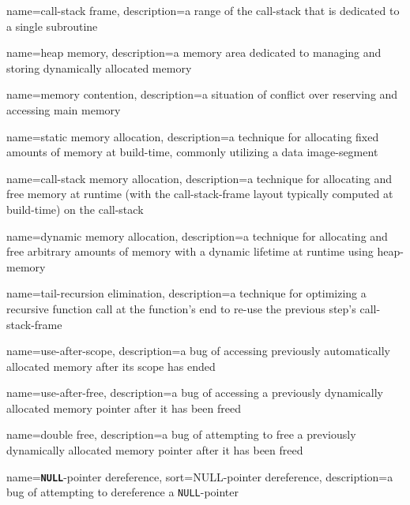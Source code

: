 {
  name={\gls{call-stack} frame},
  description={a range of the \gls{call-stack} that is dedicated to a single subroutine}
}

{
  name={heap memory},
  description={a memory area dedicated to managing and storing dynamically allocated memory}
}

{
  name={memory contention},
  description={a situation of conflict over reserving and accessing main memory}
}

{
  name={static memory allocation},
  description={a technique for allocating fixed amounts of memory at build-time, commonly utilizing a data \gls{image-segment}}
}

{
  name={\gls{call-stack} memory allocation},
  description={a technique for allocating and free memory at runtime (with the \gls{call-stack-frame} layout typically computed at build-time) on the \gls{call-stack}}
}

{
  name={dynamic memory allocation},
  description={a technique for allocating and free arbitrary amounts of memory with a dynamic lifetime at runtime using \gls{heap-memory}}
}

{
  name={tail-recursion elimination},
  description={a technique for optimizing a recursive function call at the function's end to re-use the previous step's \gls{call-stack-frame}}
}

{
  name={use-after-scope},
  description={a bug of accessing previously automatically allocated memory after its scope has ended}
}

{
  name={use-after-free},
  description={a bug of accessing a previously dynamically allocated memory pointer after it has been freed}
}

{
  name={double free},
  description={a bug of attempting to free a previously dynamically allocated memory pointer after it has been freed}
}

{
  name={\texttt{\textbf{NULL}}-pointer dereference},
  sort={NULL-pointer dereference},
  description={a bug of attempting to dereference a \lstinline[style=c]|NULL|-pointer}
}

